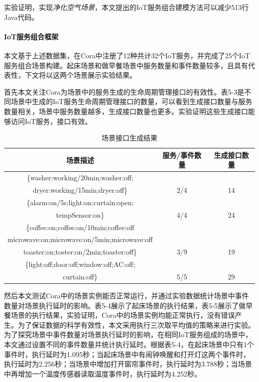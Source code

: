 \documentclass[winfonts,master,twoside]{njuthesis}
\begin{document}
实验证明，实现\textit{净化空气场景}，本文提出的IoT服务组合建模方法可以减少513行Java代码。

\paragraph{IoT服务组合框架}
本文基于上述数据集，在Cora中注册了12种共计32个IoT服务，并完成了25个IoT服务组合场景构建。起床场景和做早餐场景中服务数量和事件数量较多，且具有代表性，下文将以这两个场景展示实验结果。

首先本文关注Cora为场景中的服务生成的生命周期管理接口的有效性。表5-3是不同场景中生成的IoT服务生命周期管理接口的数量，可以看到生成接口数量与服务数量相关，场景中服务数量越多，生成接口数量也更多。实验证明这些生成接口能够访问IoT服务，接口有效。
\begin{table}[!htbp]
	\centering
	\begin{tabular}{ccc}
		\toprule
		场景描述 & 服务/事件数量  & 生成接口数量 \\
		\midrule
		\{washer:working/20min;washer:off;\\
		dryer:working/15min;dryer:off\} & 2/4 & 14 \\
		\hline
		\{alarm:on/5s;light:on;curtain:open;\\
		tempSensor:on\} & 4/4 & 24  \\
		\hline
		\{coffee:on;coffee:on/10min;coffee:off\\
		microwave:on;microwave:on/5min;microwave:off\\
		toaster:on;toster:on/2min;toaster:off\} & 3/9 & 19 \\
		\hline
		\{light:off;door:off;window:off;AC:off;\\
		curtain:off\} & 5/5 & 29 \\
		\bottomrule
	\end{tabular}
	\caption{场景接口生成结果}
	\label{tbl:device_list}
\end{table}


然后本文测试Cora中的场景实例能否正常运行，并通过实验数据统计场景中事件数量对场景执行延时的影响。表5-4展示了起床场景的执行结果，表5-5展示了做早餐场景的执行结果，实验证明，Cora中的场景实例均能正常执行，没有错误产生。为了保证数据的科学有效性，本文采用执行三次取平均值的策略来进行实验。为了探究场景中事件数量对场景执行延时的影响，在相同IoT服务组成的场景中，本文通过设置不同的事件数量并统计执行延时。根据表5-4，在起床场景中只有1个事件时，执行延时为1.095秒；当起床场景中有闹钟唤醒和打开灯这两个事件时，执行延时为2.256秒；当场景中增加打开窗帘事件时，执行延时为3.788秒；当场景中再增加一个温度传感器读取温度事件时，执行延时为4.252秒。
\end{document}
